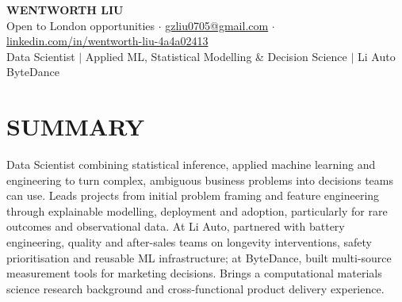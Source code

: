 \documentclass[a4paper,10pt]{article}
\begin{document}
\fontsize{10pt}{11.8pt}\selectfont

\begin{center}
{\Large\bfseries WENTWORTH LIU}\\[2pt]
{\small Open to London opportunities \;$\cdot$\; \href{mailto:gzliu0705@gmail.com}{gzliu0705@gmail.com} \;$\cdot$\; \href{https://www.linkedin.com/in/wentworth-liu-4a4a02413}{linkedin.com/in/wentworth-liu-4a4a02413}}\\[2pt]
{\small Data Scientist \;$\vert$\; Applied ML, Statistical Modelling \& Decision Science \;$\vert$\; Li Auto \textperiodcentered{} ByteDance}
\end{center}
\vspace{-4pt}

\section{SUMMARY}
Data Scientist combining statistical inference, applied machine learning and engineering to turn complex, ambiguous business problems into decisions teams can use. Leads projects from initial problem framing and feature engineering through explainable modelling, deployment and adoption, particularly for rare outcomes and observational data. At Li Auto, partnered with battery engineering, quality and after-sales teams on longevity interventions, safety prioritisation and reusable ML infrastructure; at ByteDance, built multi-source measurement tools for marketing decisions. Brings a computational materials science research background and cross-functional product delivery experience.
\end{document}
